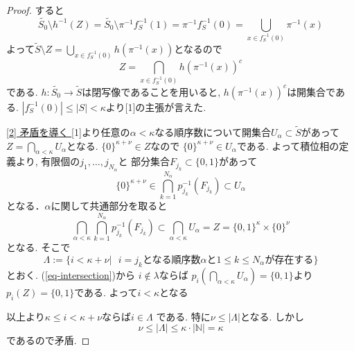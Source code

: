 \documentclass[dvipdfmx,a4paper,11pt]{article}
\newcommand{\N}{\mathbb{N}}
\newcommand{\colim}{{\rm colim}}
\theoremstyle{definition}
\begin{document}
\begin{proof}

すると
$$
\widetilde{S_0} \setminus h^{-1}(Z)
=
\widetilde{S_0} \setminus \pi^{-1}f_{S}^{-1}(1)
=
\pi^{-1} f_{S}^{-1}(0)
= \bigcup_{x \in f_{S}^{-1}(0)}  \pi^{-1}(x)
$$
よって$\widetilde{S} \setminus Z =  \bigcup_{x \in f_{S}^{-1}(0)}  h(\pi^{-1}(x))$となるので
$$
Z = \bigcap_{x \in f_{S}^{-1}(0)} h(\pi^{-1}(x))^c
$$
である. 
$h : \widetilde{S_0} \to \widetilde{S}$は閉写像であることを用いると, $h(\pi^{-1}(x))^c$は開集合である. 
$|f_{S}^{-1}(0)|\le |S| < \kappa$より[1]の主張が言えた.

\underline{[2] 矛盾を導く }
[1]より任意の$\alpha < \kappa$なる順序数について開集合$U_{\alpha} \subset \widetilde{S}$があって
$Z = \bigcap_{\alpha < \kappa} U_{\alpha}$となる. 
$\{ 0\}^{\kappa  + \nu} \in Z$なので
$ \{ 0\}^{\kappa  + \nu} \in U_{\alpha}$である.
よって積位相の定義より, 有限個の$j_1, \ldots, j_{N_{\alpha}}$と
部分集合$F_{j_k} \subset \{ 0,1\}$があって
$$
 \{ 0\}^{\kappa  + \nu}  \in 
  \bigcap_{k=1}^{N_{\alpha}} p_{j_k}^{-1}(F_{j_k})
  \subset U_{\alpha}
$$
となる．$\alpha$に関して共通部分を取ると
\begin{equation}
\label{eq-intersection}
 \bigcap_{\alpha <\kappa } \bigcap_{k=1}^{N_{\alpha}} p_{j_k}^{-1}(F_{j_k})
 \subset  \bigcap_{\alpha < \kappa}  U_{\alpha} 
 =Z=\{0,1\}^{\kappa} \times \{ 0\}^{\nu}
 \end{equation}
 となる. 
 そこで
$$
\Lambda := \{  i < \kappa + \nu  |  \text{ $i=j_{k}$となる順序数$\alpha$と$1 \le k \le N_{\alpha}$が存在する} \}
$$
とおく. 
(\ref{eq-intersection})から
$i \not \in \lambda$ならば
$p_{i}( \bigcap_{\alpha <\kappa}  U_{\alpha} ) = \{0,1\}$より
$p_{i}(Z)=\{ 0,1\}$である. 
よって$i < \kappa$となる

以上より$\kappa \le i < \kappa+\nu$ならば$i \in \Lambda$
である. 特に$\nu \le |\Lambda|$となる. 
しかし
$$
\nu \le |\Lambda| \le \kappa \cdot |\N| = \kappa
$$
であるので矛盾.
 \end{proof}
\end{document}

